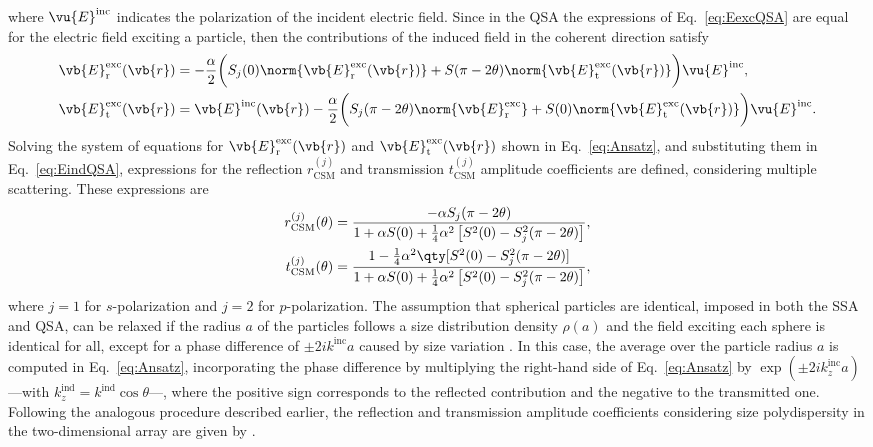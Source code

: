%
where $\vu{E}^\text{inc}$ indicates the polarization of the incident electric field. Since in the QSA the expressions of Eq.~\eqref{eq:EexcQSA} are equal for the electric field exciting a particle, then the contributions of the induced field in the coherent direction satisfy \cite{garcia2012multiple}
%
\begin{subequations}%
	\begin{align}%
		\vb{E}^\text{exc}_\text{r}(\vb{r}) &= -\frac{\alpha}{2} \bigg( S_j(0) \norm{\vb{E}^\text{exc}_\text{r}(\vb{r})} +  S(\pi-2\theta)\norm{\vb{E}^\text{exc}_\text{t}(\vb{r})}\bigg) \vu{E}^\text{inc},\\
		\vb{E}^\text{exc}_\text{t}(\vb{r}) &= \vb{E}^\text{inc}(\vb{r}) -\frac{\alpha}{2} \bigg( S_j(\pi-2\theta) \norm{\vb{E}^\text{exc}_\text{r}} + S(0)\norm{\vb{E}^\text{exc}_\text{t}(\vb{r})} \bigg)
		\vu{E}^\text{inc}.
	\end{align}%
	\label{eq:Ansatz}%
\end{subequations}%
%
Solving the system of equations for $\vb{E}^\text{exc}_\text{r}(\vb{r})$ and $\vb{E}^\text{exc}_\text{t}(\vb{r})$ shown in Eq.~\eqref{eq:Ansatz}, and substituting them in Eq.~\eqref{eq:EindQSA}, expressions for the reflection $r^{(j)}_\text{CSM}$ and transmission $t^{(j)}_\text{CSM}$ amplitude coefficients are defined, considering multiple scattering. These expressions are \cite{garcia2012multiple,barrera_coherent_2003}
%
\begin{subequations}%
	\begin{align}
		r^{(j)}_\text{CSM}(\theta)&=\frac{-\alpha S_j(\pi-2\theta)}
		{1+\alpha S(0)+\frac14 \alpha^2 \left[S^2(0)-S_j^2 (\pi-2\theta) \right]},\\
		t^{(j)}_\text{CSM}(\theta)&=\frac{1-\frac14\alpha^2\qty[S^2(0)-S_j^2(\pi-2\theta)]}
		{1+\alpha S(0)+\frac14 \alpha^2 \left[S^2(0)-S_j^2 (\pi-2\theta) \right]},
	\end{align}%
	\label{eq:CSMmono}%
\end{subequations}%
%
where $j=1$ for $s$-polarization and $j=2$ for $p$-polarization. The assumption that spherical particles are identical, imposed in both the SSA and QSA, can be relaxed if the radius $a$ of the particles follows a size distribution density $\rho(a)$ and the field exciting each sphere is identical for all, except for a phase difference of $\pm2ik^\text{inc}a$ caused by size variation \cite{vazquez-estrada_optical_2014}. In this case, the average over the particle radius $a$ is computed in Eq.~\eqref{eq:Ansatz}, incorporating the phase difference by multiplying the right-hand side of Eq.~\eqref{eq:Ansatz} by $\exp(\pm2ik_z^\text{inc} a)$ ---with $k_z^\text{ind} = k^\text{ind}\cos\theta$---, where the positive sign corresponds to the reflected contribution and the negative to the transmitted one. Following the analogous procedure described earlier, the reflection and transmission amplitude coefficients considering size polydispersity in the two-dimensional array are given by \cite{vazquez-estrada_optical_2014}.
